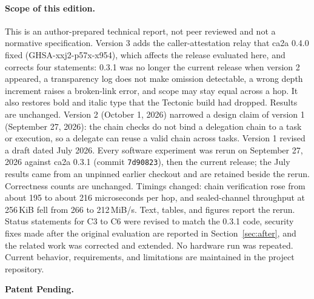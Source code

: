 \documentclass[10pt,letterpaper]{article}
\newcounter{claim}
\begin{document}
\paragraph{Scope of this edition.}
This is an author-prepared technical report, not peer reviewed and not a normative
specification. Version 3 adds the caller-attestation relay that ca2a 0.4.0 fixed
(GHSA-xxj2-p57x-x954), which affects the release evaluated here, and corrects four statements:
0.3.1 was no longer the current release when version 2 appeared, a transparency log does not
make omission detectable, a wrong depth increment raises a broken-link error, and scope may stay
equal across a hop. It also restores bold and italic type that the Tectonic build had dropped. Results are unchanged. Version 2 (October 1, 2026) narrowed a design claim
of version 1 (September 27, 2026): the chain checks do not bind a delegation chain to a task or
execution, so a delegate can reuse a valid chain across tasks. Version 1 revised a draft dated
July 2026. Every software experiment was rerun on September 27, 2026 against ca2a 0.3.1 (commit
\texttt{7d90823}), then the current release; the July
results came from an unpinned earlier checkout and are retained beside the rerun. Correctness
counts are unchanged. Timings changed: chain verification rose from about 195 to about 216
microseconds per hop, and sealed-channel throughput at 256\,KiB fell from 266 to 212\,MiB/s.
Text, tables, and figures report the rerun. Status statements for C3 to C6 were revised to
match the 0.3.1 code, security fixes made after the original evaluation are reported in
Section~\ref{sec:after}, and the related work was corrected and extended. No hardware run was
repeated. Current behavior, requirements, and limitations are maintained in the project
repository.

\noindent\textbf{Patent Pending.}

\tableofcontents
\newpage












\end{document}
